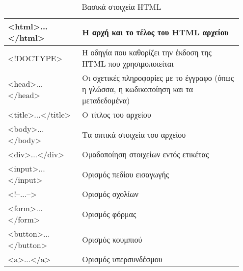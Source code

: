\begin{table}[h]
\caption{Βασικά στοιχεία HTML}
\label{tbl:html_basic_elements}
\begin{tabular}{|p{0.3\linewidth}|p{0.65\linewidth}|}
\hline
\textless{}html\textgreater{}...\textless{}/html\textgreater{}     & Η αρχή και το τέλος του HTML αρχείου                                                      \\ \hline
\textless{}!DOCTYPE\textgreater{}                                  & Η οδηγία που καθορίζει την έκδοση της HTML που χρησιμοποιείται                            \\ \hline
\textless{}head\textgreater{}...\textless{}/head\textgreater{}     & Οι σχετικές πληροφορίες με το έγγραφο (όπως η γλώσσα, η κωδικοποίηση και τα μεταδεδομένα) \\ \hline
\textless{}title\textgreater{}...\textless{}/title\textgreater{}   & Ο τίτλος του αρχείου                                                                      \\ \hline
\textless{}body\textgreater{}...\textless{}/body\textgreater{}     & Τα οπτικά στοιχεία του αρχείου                                                            \\ \hline
\textless{}div\textgreater{}...\textless{}/div\textgreater{}       & Ομαδοποίηση στοιχείων εντός ετικέτας                                                      \\ \hline
\textless{}input\textgreater{}...\textless{}/input\textgreater{}   & Ορισμός πεδίου εισαγωγής                                                                  \\ \hline
\textless{}!--...--\textgreater{}                                  & Ορισμός σχολίων                                                                           \\ \hline
\textless{}form\textgreater{}...\textless{}/form\textgreater{}     & Ορισμός φόρμας                                                                            \\ \hline
\textless{}button\textgreater{}...\textless{}/button\textgreater{} & Ορισμός κουμπιού                                                                          \\ \hline
\textless{}a\textgreater{}...\textless{}/a\textgreater{}           & Ορισμός υπερσυνδέσμου                                                                     \\ \hline
\end{tabular}
\end{table}

